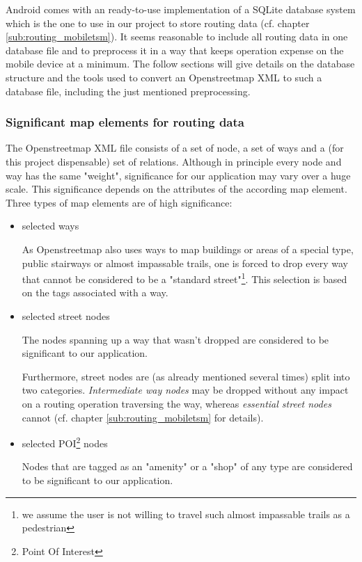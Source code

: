 
Android comes with an ready-to-use implementation of a SQLite database system which is the one to use in our project to store routing data (cf. chapter \ref{sub:routing_mobiletsm}). It seems reasonable to include all routing data in one database file and to preprocess it in a way that keeps operation expense on the mobile device at a minimum. The follow sections will give details on the database structure and the tools used to convert an Openstreetmap XML to such a database file, including the just mentioned preprocessing.

\subsubsection{Significant map elements for routing data}

The Openstreetmap XML file consists of a set of node, a set of ways and a (for this project dispensable) set of relations. Although in principle every node and way has the same "weight", significance for our application may vary over a huge scale. This significance depends on the attributes of the according map element. Three types of map elements are of high significance:

\begin{itemize}
	\item selected ways
	
		As Openstreetmap also uses ways to map buildings or areas of a special type, public stairways or almost impassable trails, one is forced to drop every way that cannot be considered to be a "standard street"\footnote{we assume the user is not willing to travel such almost impassable trails as a pedestrian}. This selection is based on the tags associated with a way. 
	
	\item selected street nodes
	
		The nodes spanning up a way that wasn't dropped are considered to be significant to our application.\newline
		
		Furthermore, street nodes are (as already mentioned several times) split into two categories. \emph{Intermediate way nodes} may be dropped without any impact on a routing operation traversing the way, whereas \emph{essential street nodes} cannot (cf. chapter \ref{sub:routing_mobiletsm} for details).
		
	\item selected POI\footnote{Point Of Interest} nodes
	
		Nodes that are tagged as an "amenity" or a "shop" of any type are considered to be significant to our application.

\end{itemize}


